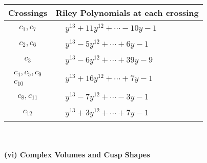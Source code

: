 \documentclass[1p]{elsarticle_modified}
\theoremstyle{definition}
\begin{document}
\begin{tabular}{m{50pt}|m{274pt}}
Crossings & \hspace{64pt}Riley Polynomials at each crossing \\
\hline $$\begin{aligned}c_{1},c_{7}\end{aligned}$$&$\begin{aligned}
&y^{13}+11 y^{12}+\cdots-10 y-1
\end{aligned}$\\
\hline $$\begin{aligned}c_{2},c_{6}\end{aligned}$$&$\begin{aligned}
&y^{13}-5 y^{12}+\cdots+6 y-1
\end{aligned}$\\
\hline $$\begin{aligned}c_{3}\end{aligned}$$&$\begin{aligned}
&y^{13}-6 y^{12}+\cdots+39 y-9
\end{aligned}$\\
\hline $$\begin{aligned}c_{4},c_{5},c_{9}\\c_{10}\end{aligned}$$&$\begin{aligned}
&y^{13}+16 y^{12}+\cdots+7 y-1
\end{aligned}$\\
\hline $$\begin{aligned}c_{8},c_{11}\end{aligned}$$&$\begin{aligned}
&y^{13}-7 y^{12}+\cdots-3 y-1
\end{aligned}$\\
\hline $$\begin{aligned}c_{12}\end{aligned}$$&$\begin{aligned}
&y^{13}+3 y^{12}+\cdots+7 y-1
\end{aligned}$\\
\hline
\end{tabular}\\~\\
\newpage\flushleft \textbf{(vi) Complex Volumes and Cusp Shapes}
\end{document}
